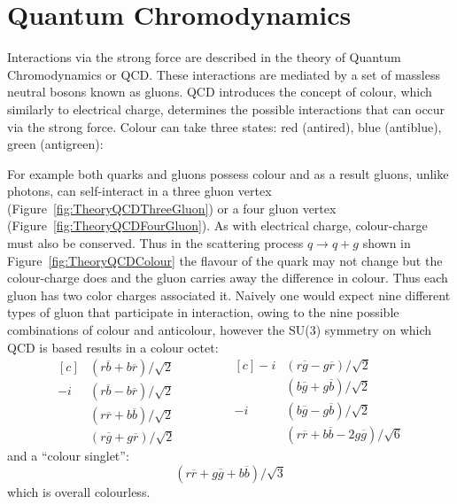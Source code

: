 \section{Quantum Chromodynamics}

Interactions via the strong force are described in the theory of Quantum Chromodynamics or QCD. These interactions are mediated by a set of massless neutral bosons known as gluons. QCD introduces the concept of colour, which similarly to electrical charge, determines the possible interactions that can occur via the strong force. Colour can take three states: red (antired), blue (antiblue), green (antigreen):

For example both quarks and gluons possess colour and as a result gluons, unlike photons, can self-interact in a three gluon vertex (Figure~\ref{fig:TheoryQCDThreeGluon}) or a four gluon vertex (Figure~\ref{fig:TheoryQCDFourGluon}). As with electrical charge, colour-charge must also be conserved. Thus in the scattering process $q\rightarrow q+g$ shown in Figure~\ref{fig:TheoryQCDColour} the flavour of the quark may not change but the colour-charge does and the gluon carries away the difference in colour. Thus each gluon has two color charges associated it. Naively one would expect nine different types of gluon that participate in interaction, owing to the nine possible combinations of colour and anticolour, however the SU(3) symmetry on which QCD is based results in a colour octet:
\begin{equation*}
\begin{aligned}[c]
  &(r\overline{b}+b\overline{r})/\sqrt{2} \\
  -i&(r\overline{b}-b\overline{r})/\sqrt{2} \\
  &(r\overline{r}+b\overline{b})/\sqrt{2} \\
  &(r\overline{g}+g\overline{r})/\sqrt{2}
\end{aligned}
\qquad\qquad
\begin{aligned}[c]
  -i&(r\overline{g}-g\overline{r})/\sqrt{2} \\
  &(b\overline{g}+g\overline{b})/\sqrt{2} \\
  -i&(b\overline{g}-g\overline{b})/\sqrt{2} \\
  &(r\overline{r}+b\overline{b}-2g\overline{g})/\sqrt{6}
\end{aligned}
\end{equation*}
%
and a ``colour singlet'':
%
\begin{equation}
  (r\overline{r} + g\overline{g} + b\overline{b})/\sqrt{3}
\end{equation}
%
which is overall colourless.

